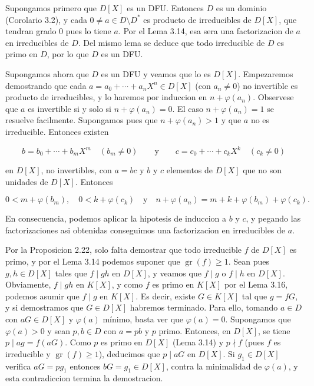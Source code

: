 \begin{proofbox}
Supongamos primero que $D[X]$ es un DFU. Entonces $D$ es un dominio (Corolario 3.2), y cada $0\neq a\in D\setminus D^{*}$ es producto de irreducibles de $D[X]$, que tendran grado 0 pues lo tiene $a$. Por el Lema 3.14, esa sera una factorizacion de $a$ en irreducibles de $D$. Del mismo lema se deduce que todo irreducible de $D$ es primo en $D$, por lo que $D$ es un DFU.

Supongamos ahora que $D$ es un DFU y veamos que lo es $D[X]$. Empezaremos demostrando que cada $a=a_{0}+\cdots+a_{n}X^{n}\in D[X]$ (con $a_{n}\neq 0$) no invertible es producto de irreducibles, y lo haremos por induccion en $n+\varphi(a_{n})$. Observese que $a$ es invertible si y solo si $n+\varphi(a_{n})=0$. El caso $n+\varphi(a_{n})=1$ se resuelve facilmente. Supongamos pues que $n+\varphi(a_{n})>1$ y que $a$ no es irreducible. Entonces existen

\[b=b_{0}+\cdots+b_{m}X^{m}\quad(b_{m}\neq 0)\qquad\text{y}\qquad c=c_{0}+\cdots +c_{k}X^{k}\quad(c_{k}\neq 0)\]

en $D[X]$, no invertibles, con $a=bc$ y $b$ y $c$ elementos de $D[X]$ que no son unidades de $D[X]$. Entonces

\[0<m+\varphi(b_{m}),\quad 0<k+\varphi(c_{k})\quad\text{y}\quad n+\varphi(a_{n})= m+k+\varphi(b_{m})+\varphi(c_{k}).\]

En consecuencia, podemos aplicar la hipotesis de induccion a $b$ y $c$, y pegando las factorizaciones asi obtenidas conseguimos una factorizacion en irreducibles de $a$.

Por la Proposicion 2.22, solo falta demostrar que todo irreducible $f$ de $D[X]$ es primo, y por el Lema 3.14 podemos suponer que $\operatorname{gr}(f)\geq 1$. Sean pues $g,h\in D[X]$ tales que $f\mid gh$ en $D[X]$, y veamos que $f\mid g$ o $f\mid h$ en $D[X]$. Obviamente, $f\mid gh$ en $K[X]$, y como $f$ es primo en $K[X]$ por el Lema 3.16, podemos asumir que $f\mid g$ en $K[X]$. Es decir, existe $G\in K[X]$ tal que $g=fG$, y si demostramos que $G\in D[X]$ habremos terminado. Para ello, tomando $a\in D$ con $aG\in D[X]$ y $\varphi(a)$ mínimo, basta ver que $\varphi(a)=0$. Supongamos que $\varphi(a)>0$ y sean $p,b\in D$ con $a=pb$ y $p$ primo. Entonces, en $D[X]$, se tiene $p\mid ag=f(aG)$. Como $p$ es primo en $D[X]$ (Lema 3.14) y $p\nmid f$ (pues $f$ es irreducible y $\operatorname{gr}(f)\geq 1$), deducimos que $p\mid aG$ en $D[X]$. Si $g_{1}\in D[X]$ verifica $aG=pg_{1}$ entonces $bG=g_{1}\in D[X]$, contra la minimalidad de $\varphi(a)$, y esta contradiccion termina la demostracion.
\end{proofbox}

